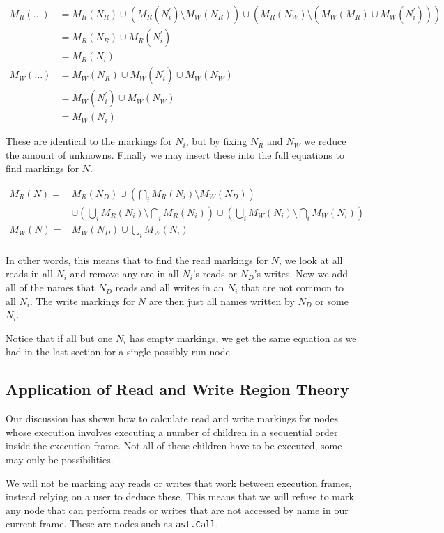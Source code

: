 \documentclass[twoside,a4paper]{report}
\begin{document}
\begin{align*}
M_R(\ldots) &= M_R(N_R) \cup (M_R(N_i^\prime) \setminus M_W(N_R)) \cup (M_R(N_W) \setminus (M_W(M_R) \cup M_W(N_i^\prime))) \\
            &= M_R(N_R) \cup M_R(N_i^\prime) \\
            &= M_R(N_i) \\
M_W(\ldots) &= M_W(N_R) \cup M_W(N_i^\prime) \cup M_W(N_W) \\
            &= M_W(N_i^\prime) \cup M_W(N_W) \\
            &= M_W(N_i)
\end{align*}

These are identical to the markings for $N_i$, but by fixing $N_R$ and $N_W$ we reduce the amount of unknowns. Finally we may insert these into
the full equations to find markings for $N$.

\begin{align*}
M_R(N) =& M_R(N_D) \cup (\bigcap_i M_R(N_i) \setminus M_W(N_D)) \\
        & \cup (\bigcup_i M_R(N_i) \setminus \bigcap_i M_R(N_i)) \cup (\bigcup_i M_W(N_i) \setminus \bigcap_i M_W(N_i)) \\
M_W(N) =& M_W(N_D) \cup \bigcup_i M_W(N_i)\\
\end{align*}

In other words, this means that to find the read markings for $N$, we look at all reads in all $N_i$ and remove any are in all $N_i$'s reads or $N_D$'s writes.
Now we add all of the names that $N_D$ reads and all writes in an $N_i$ that are not common to all $N_i$. The write markings for $N$ are then just all names
written by $N_D$ or some $N_i$.

Notice that if all but one $N_i$ has empty markings, we get the same equation as we had in the last section for a single possibly run node.

\subsection{Application of Read and Write Region Theory}

Our discussion has shown how to calculate read and write markings for nodes whose execution involves executing a number of children in a sequential order inside
the execution frame. Not all of these children have to be executed, some may only be possibilities.

We will not be marking any reads or writes that work between execution frames, instead relying on a user to deduce these. This means that we will refuse to mark
any node that can perform reads or writes that are not accessed by name in our current frame. These are nodes such as \texttt{ast.Call}.
\end{document}
